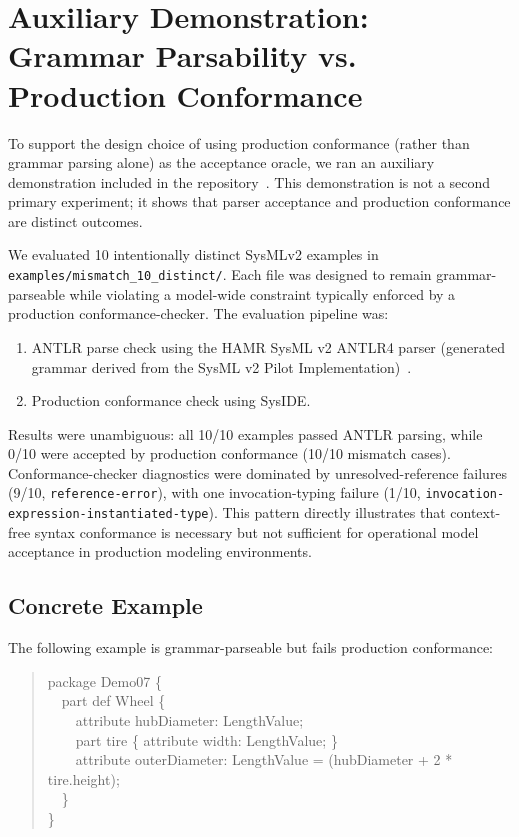 \section{Auxiliary Demonstration: Grammar Parsability vs. Production Conformance}
\label{appendix:antlr_vs_syside}

To support the design choice of using production conformance (rather than grammar parsing alone) as the acceptance oracle, we ran an auxiliary demonstration included in the repository~\cite{sysmbenchCompilerLoopRepo2026}. This demonstration is not a second primary experiment; it shows that parser acceptance and production conformance are distinct outcomes.

We evaluated 10 intentionally distinct SysMLv2 examples in \texttt{examples/mismatch\_10\_distinct/}. Each file was designed to remain grammar-parseable while violating a model-wide constraint typically enforced by a production conformance-checker. The evaluation pipeline was:
\begin{enumerate}
    \item ANTLR parse check using the HAMR SysML v2 ANTLR4 parser (generated grammar derived from the SysML v2 Pilot Implementation)~\cite{hamrSysmlParser2026,sysmlV2PilotImplementation2026}.
    \item Production conformance check using SysIDE.
\end{enumerate}

Results were unambiguous: all 10/10 examples passed ANTLR parsing, while 0/10 were accepted by production conformance (10/10 mismatch cases). Conformance-checker diagnostics were dominated by unresolved-reference failures (9/10, \texttt{reference-error}), with one invocation-typing failure (1/10, \texttt{invocation-expression-instantiated-type}). This pattern directly illustrates that context-free syntax conformance is necessary but not sufficient for operational model acceptance in production modeling environments.

\subsection*{Concrete Example}
The following example is grammar-parseable but fails production conformance:
\begin{quote}
\small\ttfamily
package Demo07 \{\\
\ \ part def Wheel \{\\
\ \ \ \ attribute hubDiameter: LengthValue;\\
\ \ \ \ part tire \{ attribute width: LengthValue; \}\\
\ \ \ \ attribute outerDiameter: LengthValue = (hubDiameter + 2 * tire.height);\\
\ \ \}\\
\}
\end{quote}

